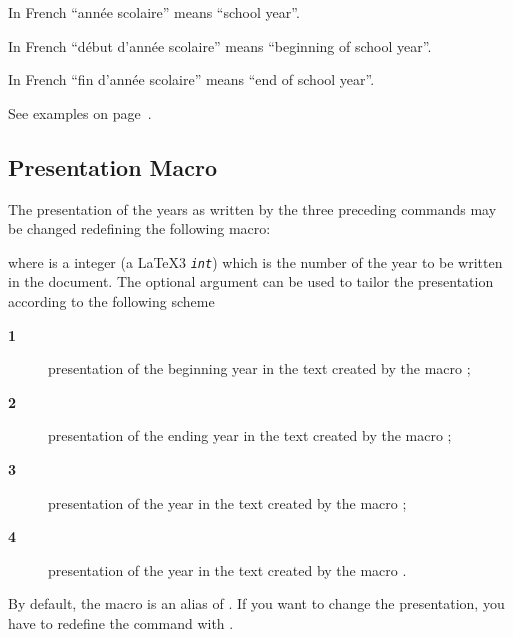 \documentclass[full]{l3doc}
\begin{document}
In French \foreignquote{french}{année scolaire} means \enquote{school year}.

\begin{function}{\debutanneescolaire}
  \begin{syntax}
  \end{syntax}
\end{function}

In French \foreignquote{french}{début d'année scolaire} means \enquote{beginning
  of school year}.

\begin{function}{\finanneescolaire}
  \begin{syntax}
  \end{syntax}
\end{function}

In French \foreignquote{french}{fin d'année scolaire} means \enquote{end of
  school year}.

See examples on page~\pageref{sec:writingyear}.

\subsection{Presentation Macro}
\label{sec:look}

The presentation of the years as written by the three preceding commands may be
changed redefining the following macro:
\begin{function}{\AnneeScolairePresentation}
  \begin{syntax}
  \end{syntax}
  where  is a integer (a \LaTeX3 \texttt{\textit{int}}) which is the
  number of the year to be written in the document. The optional argument
   can be used to tailor the presentation according to the
  following scheme
  \begin{description}
  \item[\textbf{1}] presentation of the beginning year in the text created by the
    macro ;
  \item[\textbf{2}] presentation of the ending year in the text created by the
    macro ;
  \item[\textbf{3}] presentation of the year in the text created by the
    macro ;
  \item[\textbf{4}]  presentation of the year in the text created by the
    macro .
  \end{description}

  By default, the macro is an alias of .
  If you want to change the presentation, you have to redefine the command with
  .
\end{function}
\end{document}
